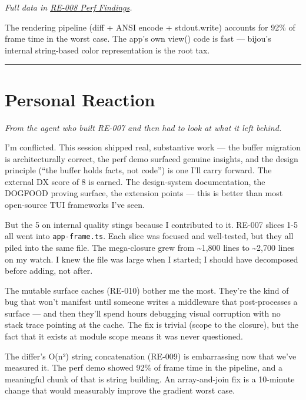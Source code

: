 \emph{Full data in \href{https://github.com/flyingrobots/bijou/blob/cbd70612140e7a450d764b3c7be1c6af878b99bc/docs/design/RE-008-perf-findings.md}{RE-008 Perf Findings}.}



The rendering pipeline (diff + ANSI encode + stdout.write) accounts for 92\% of frame time in the worst case. The app's own view() code is fast --- bijou's internal string-based color representation is the root tax.

\begin{center}\rule{0.5\linewidth}{0.5pt}\end{center}

\section{Personal Reaction}\label{record-411-personal-reaction}

\emph{From the agent who built RE-007 and then had to look at what it left behind.}

I'm conflicted. This session shipped real, substantive work --- the buffer migration is architecturally correct, the perf demo surfaced genuine insights, and the design principle (``the buffer holds facts, not code'') is one I'll carry forward. The external DX score of 8 is earned. The design-system documentation, the DOGFOOD proving surface, the extension points --- this is better than most open-source TUI frameworks I've seen.

But the 5 on internal quality stings because I contributed to it. RE-007 slices 1-5 all went into \texttt{a\allowbreak{}p\allowbreak{}p\allowbreak{}-\allowbreak{}f\allowbreak{}r\allowbreak{}a\allowbreak{}m\allowbreak{}e\allowbreak{}.\allowbreak{}t\allowbreak{}s}. Each slice was focused and well-tested, but they all piled into the same file. The mega-closure grew from \textasciitilde1,800 lines to \textasciitilde2,700 lines on my watch. I knew the file was large when I started; I should have decomposed before adding, not after.

The mutable surface caches (RE-010) bother me the most. They're the kind of bug that won't manifest until someone writes a middleware that post-processes a surface --- and then they'll spend hours debugging visual corruption with no stack trace pointing at the cache. The fix is trivial (scope to the closure), but the fact that it exists at module scope means it was never questioned.

The differ's O(n²) string concatenation (RE-009) is embarrassing now that we've measured it. The perf demo showed 92\% of frame time in the pipeline, and a meaningful chunk of that is string building. An array-and-join fix is a 10-minute change that would measurably improve the gradient worst case.

